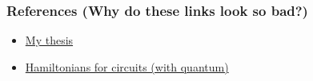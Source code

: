 \begin{frame}
\frametitle{References (Why do these links look so bad?)}
  \begin{itemize}
    \item \href{https://web.physics.ucsb.edu/~martinisgroup/theses/Sank2014.pdf}{My thesis}
    \item \href{https://arxiv.org/abs/1610.03438}{Hamiltonians for circuits (with quantum)}
  \end{itemize}
\end{frame}
